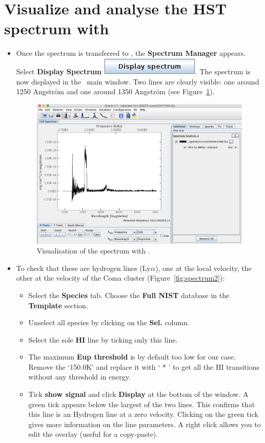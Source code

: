 \documentclass [a4paper, 12pt]{article}
\begin{document}
\section{Visualize and analyse the HST spectrum with \cassis}

\begin{itemize}
\item Once the spectrum is transferred to \cassis, the \textbf{Spectrum
Manager} appears. Select \textbf{Display Spectrum} \includegraphics[width=0.2
\textwidth]{../images/cassis_button_display-spectrum.png}. The
spectrum is now displayed in the \cassis\ main window. Two lines are clearly
visible: one around 1250 Angstr\"om and one around 1350 Angstr\"om (see
Figure~\ref{fig:spectrum}).


\begin{figure}[H]
\center
\includegraphics[width=0.6  \textwidth]{../images/cassis_display_spectrum-1.jpg}
\caption{Visualisation of the spectrum with \cassis.}
\label{fig:spectrum}
\end{figure}
\item To check that these are hydrogen lines (Ly$\alpha$), one at the local
velocity, the other at the velocity of the Coma cluster
(Figure~\ref{fig:spectrum2}):
\begin{itemize}
    \item Select the \textbf{Species} tab. Choose the \textbf{Full NIST}
    database in the \textbf{Template} section.
    \item Unselect all species by clicking on the \textbf{Sel.} column.
    \item Select the sole \textbf{HI} line by ticking only this line.
    \item The maximum \textbf{Eup threshold} is by default too low for our
    case. Remove the `150.0K' and replace it with ` *  ' to get all the HI
    transitions without any threshold in energy.
    \item Tick \textbf{show signal} and click \textbf{Display} at the bottom of
    the window. A green tick appears below the largest of the two lines. This
    confirms that this line is an Hydrogen line at a zero velocity. Clicking on
    the green tick gives more information on the line parameters. A right click
    allows you to edit the overlay (useful for a copy-paste).
\end{itemize}


\end{itemize}
\end{document}
